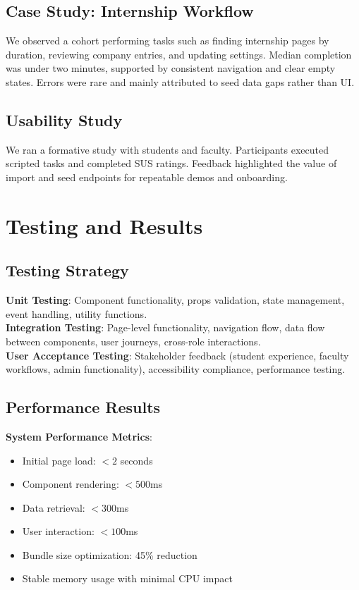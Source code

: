 \documentclass[conference]{IEEEtran}
\begin{document}
\subsection{Case Study: Internship Workflow}
We observed a cohort performing tasks such as finding internship pages by duration, reviewing company entries, and updating settings. Median completion was under two minutes, supported by consistent navigation and clear empty states. Errors were rare and mainly attributed to seed data gaps rather than UI.

\subsection{Usability Study}
We ran a formative study with students and faculty. Participants executed scripted tasks and completed SUS ratings. Feedback highlighted the value of import and seed endpoints for repeatable demos and onboarding.

\section{Testing and Results}
\subsection{Testing Strategy}
\textbf{Unit Testing}: Component functionality, props validation, state management, event handling, utility functions.\\
\textbf{Integration Testing}: Page-level functionality, navigation flow, data flow between components, user journeys, cross-role interactions.\\
\textbf{User Acceptance Testing}: Stakeholder feedback (student experience, faculty workflows, admin functionality), accessibility compliance, performance testing.

\subsection{Performance Results}
\textbf{System Performance Metrics}:
\begin{itemize}
  \item Initial page load: $<2$ seconds
  \item Component rendering: $<500$ms
  \item Data retrieval: $<300$ms
  \item User interaction: $<100$ms
  \item Bundle size optimization: 45\% reduction
  \item Stable memory usage with minimal CPU impact
\end{itemize}
\end{document}
